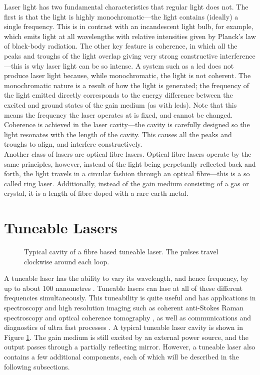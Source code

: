 Laser light has two fundamental characteristics that regular light does not. The first is that the light is highly monochromatic---the light contains (ideally) a single frequency. This is in contrast with an incandescent light bulb, for example, which emits light at all wavelengths with relative intensities given by Planck's law of black-body radiation. The other key feature is coherence, in which all the peaks and troughs of the light overlap giving very strong constructive interference---this is why laser light can be so intense. A system such as a \gls{led} does not produce laser light because, while monochromatic, the light is not coherent. The monochromatic nature is a result of how the light is generated; the frequency of the light emitted directly corresponds to the energy difference between the excited and ground states of the gain medium (as with \gls{led}s). Note that this means the frequency the laser operates at is fixed, and cannot be changed. Coherence is achieved in the laser cavity---the cavity is carefully designed so the light resonates with the length of the cavity. This causes all the peaks and troughs to align, and interfere constructively. \\

Another class of lasers are optical fibre lasers. Optical fibre lasers operate by the same principles, however, instead of the light being perpetually reflected back and forth, the light travels in a circular fashion through an optical fibre---this is a so called ring laser. Additionally, instead of the gain medium consisting of a gas or crystal, it is a length of fibre doped with a rare-earth metal. \\

\section{Tuneable Lasers}
\begin{figure}[tbp]
\centering

\caption[Typical cavity of a tuneable laser.]{Typical cavity of a fibre based tuneable laser. The pulses travel clockwise around each loop.}
\label{fig:cavity}
\end{figure}

A tuneable laser has the ability to vary its wavelength, and hence frequency, by up to about 100 nanometres \cite{bohun, burgoyne2010, yamashita}. Tuneable lasers can lase at all of these different frequencies simultaneously. This tuneability is quite useful and has applications in spectroscopy and high resolution imaging such as coherent anti-Stokes Raman spectroscopy and optical coherence tomography \cite{bohun, burgoyne2014, yamashita}, as well as communications and diagnostics of ultra fast processes \cite{silfvast}. A typical tuneable laser cavity is shown in Figure \ref{fig:cavity}. The gain medium is still excited by an external power source, and the output passes through a partially reflecting mirror. However, a tuneable laser also contains a few additional components, each of which will be described in the following subsections. 

